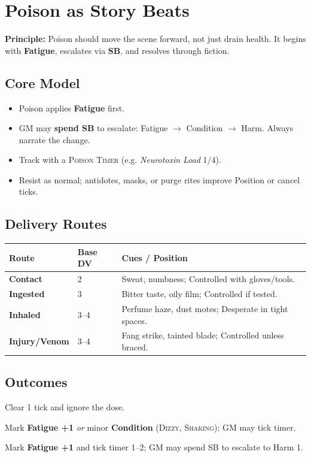 \newpage
\section{Poison as Story Beats}\label{sec:poison_sb}

\textbf{Principle:} Poison should move the scene forward, not just drain health. It begins with \textbf{Fatigue}, escalates via \textbf{SB}, and resolves through fiction.

\subsection*{Core Model}
\begin{itemize}
    \item Poison applies \textbf{Fatigue} first.
    \item GM may \textbf{spend SB} to escalate: Fatigue $\to$ Condition $\to$ Harm. Always narrate the change.
    \item Track with a \textsc{Poison Timer } (e.g. \emph{Neurotoxin Load} 1/4).
    \item Resist as normal; antidotes, masks, or purge rites improve Position or cancel ticks.
\end{itemize}

\subsection*{Delivery Routes}
\begin{tabularx}{\linewidth}{>{\bfseries}l l X}
\toprule
Route & Base DV & Cues / Position \\
\midrule
Contact & 2 & Sweat, numbness; Controlled with gloves/tools. \\
Ingested & 3 & Bitter taste, oily film; Controlled if tested. \\
Inhaled & 3--4 & Perfume haze, dust motes; Desperate in tight spaces. \\
Injury/Venom & 3--4 & Fang strike, tainted blade; Controlled unless braced. \\
\bottomrule
\end{tabularx}

\subsection*{Outcomes}
\begin{description}[leftmargin=1.6em]
    \item[\textbf{Strong Hit.}] Clear 1 tick and ignore the dose.
    \item[\textbf{Mixed.}] Mark \textbf{Fatigue +1} \emph{or} minor \textbf{Condition} (\textsc{Dizzy}, \textsc{Shaking}); GM may tick timer.
    \item[\textbf{Miss.}] Mark \textbf{Fatigue +1} and tick timer 1--2; GM may spend SB to escalate to Harm 1.
\end{description}


